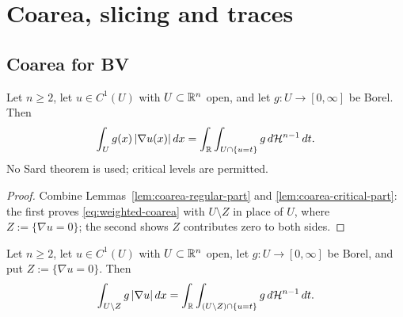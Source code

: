 \chapter{Coarea, slicing and traces}\label{ch:coarea}

\section{Coarea for BV}\label{sec:coarea}

\begin{theorem}\label{thm:weighted-coarea}
Let $n\ge2$, let $u\in C^1(U)$ with $U\subset\mathbb R^n$ open, and let
$g:U\to[0,\infty]$ be Borel.
Then
\begin{equation}\label{eq:weighted-coarea}
  \int_Ug(x)\,|\nabla u(x)|\,dx
  =\int_\mathbb R\int_{U\cap\{u=t\}}g\,d\mathcal H^{n-1}\,dt .
\end{equation}
No Sard theorem is used; critical levels are permitted.
\end{theorem}

\begin{proof}
Combine Lemmas~\ref{lem:coarea-regular-part} and
\ref{lem:coarea-critical-part}: the first proves
\eqref{eq:weighted-coarea} with $U\setminus Z$ in place of $U$, where
$Z:=\{\nabla u=0\}$; the second shows $Z$ contributes zero to both sides.
\end{proof}

\begin{lemma}\label{lem:coarea-regular-part}
Let $n\ge2$, let $u\in C^1(U)$ with $U\subset\mathbb R^n$ open, let
$g:U\to[0,\infty]$ be Borel, and put $Z:=\{\nabla u=0\}$.  Then
\[
  \int_{U\setminus Z}g\,|\nabla u|\,dx
  =\int_\mathbb R\int_{(U\setminus Z)\cap\{u=t\}}g\,d\mathcal H^{n-1}\,dt .
\]
\end{lemma}

